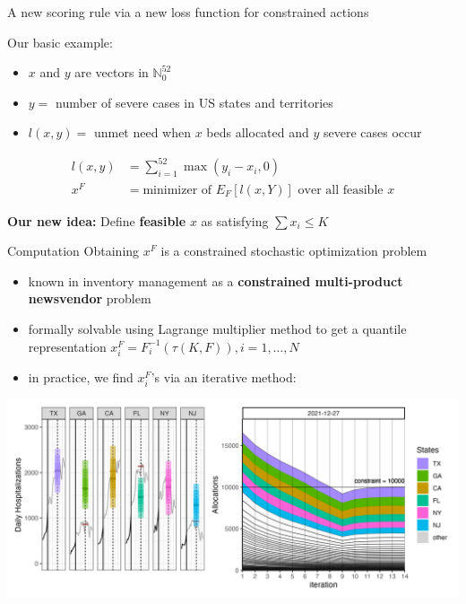 \documentclass[
  9pt,
  ignorenonframetext,
]{beamer}
\begin{document}
\begin{frame}{A new scoring rule via a new loss function for constrained
actions}
\protect\hypertarget{a-new-scoring-rule-via-a-new-loss-function-for-constrained-actions}{}
\begin{block}{Our basic example:}
\protect\hypertarget{our-basic-example}{}
\begin{itemize}
\item
  \(x\) and \(y\) are vectors in \(\mathbb{N}_0^{52}\)
\item
  \(y =\) number of severe cases in US states and territories
\item
  \(l(x,y) =\) unmet need when \(x\) beds allocated and \(y\) severe
  cases occur
\end{itemize}

\begin{align*}
l(x,y) &= \sum_{i=1}^{52} \max(y_i - x_i, 0)\\
x^F &= \text{minimizer of } E_{F}[l(x,Y)] \text{ over all feasible } x
\end{align*} 

\textbf{Our new idea:} Define \textbf{feasible} \(x\) as satisfying
\(\displaystyle{\sum x_i \leq K}\)

\end{block}
\end{frame}

\begin{frame}{Computation}
\protect\hypertarget{computation}{}
Obtaining \(x^F\) is a constrained stochastic optimization problem

\begin{itemize}
\item
  known in inventory management as a \textbf{constrained multi-product
  newsvendor} problem
\item
  formally solvable using Lagrange multiplier method to get a quantile
  representation \(x_i^F = F_i^{-1}(\tau(K,F)), i = 1,\ldots,N\)
\item
  in practice, we find \(x_i^F\)'s via an iterative method:
\end{itemize}

\includegraphics{../plots/output/iter_combo.png}
\end{frame}
\end{document}
